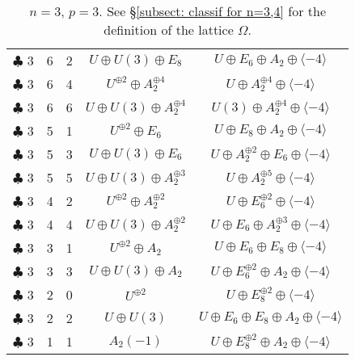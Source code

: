 \documentclass{amsart}
\theoremstyle{definition}
\begin{document}
\begin{table}[h]
\begin{tabular}{c|c|c|c|c}
 $\clubsuit$ 3&6&2&$U\oplus U(3)\oplus E_8$&$U\oplus E_6\oplus A_2\oplus \langle -4\rangle$\\
 
 $\clubsuit$ 3&6&4&$U^{\oplus 2}\oplus A_2^{\oplus 4}$&$U\oplus A_2^{\oplus 4}\oplus \langle -4\rangle$\\
 
 $\clubsuit$ 3&6&6&$U\oplus U(3)\oplus A_2^{\oplus 4}$&$U(3)\oplus A_2^{\oplus 4}\oplus \langle -4\rangle$\\
 \hline
 
 $\clubsuit$ 3&5&1&$U^{\oplus 2}\oplus E_6$&$U\oplus E_8\oplus A_2\oplus \langle -4\rangle$\\
 
 $\clubsuit$ 3&5&3&$U\oplus U(3)\oplus E_6$&$U\oplus A_2^{\oplus 2}\oplus E_6\oplus \langle -4\rangle$\\
 
 $\clubsuit$ 3&5&5&$U\oplus U(3)\oplus A_2^{\oplus 3}$&$U\oplus A_2^{\oplus 5}\oplus \langle -4\rangle$\\
 \hline

 $\clubsuit$ 3&4&2&$U^{\oplus 2}\oplus A_2^{\oplus 2}$&$U\oplus E_6^{\oplus 2} \oplus \langle -4\rangle$\\
 
 $\clubsuit$ 3&4&4&$U\oplus U(3)\oplus A_2^{\oplus 2}$&$U\oplus E_6\oplus A_2^{\oplus 3}\oplus \langle -4\rangle$\\

 \hline
 
 $\clubsuit$ 3&3&1&$U^{\oplus 2}\oplus A_2$&$U\oplus E_6\oplus E_8\oplus \langle -4\rangle$\\
 
 $\clubsuit$ 3&3&3&$U\oplus U(3)\oplus A_2$&$U\oplus E_6^{\oplus 2}\oplus A_2 \oplus \langle -4\rangle$\\
 \hline
 $\clubsuit$ 3&2&0&$U^{\oplus 2}$&$U\oplus E_8^{\oplus 2}\oplus \langle -4\rangle$\\
 
 $\clubsuit$ 3&2&2&$U\oplus U(3)$&$U\oplus E_6\oplus E_8\oplus A_2\oplus \langle -4\rangle$\\
 \hline
 
 $\clubsuit$ 3&1&1&$A_2(-1)$&$U\oplus E_8^{\oplus 2}\oplus A_2\oplus \langle -4\rangle$\\
 
 \end{tabular}
 \vspace*{2mm}
  \caption{$n=3$, $p=3$. See \S \ref{subsect: classif for n=3,4} for the definition of the lattice $\Omega$.}\label{n=3,ord3}
 \end{table}
 
\end{document}
